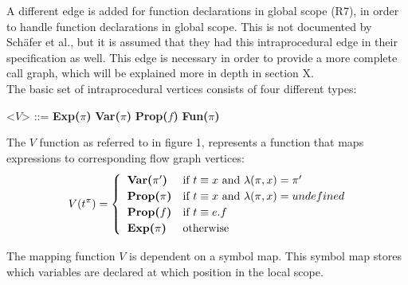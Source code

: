 \documentclass[journal,10pt]{IEEEtran} %
\begin{document}
A different edge is added for function declarations in global scope (R7), in order to handle function declarations in global scope. This is not documented by Sch\"{a}fer et al., but it is assumed that they had this intraprocedural edge in their specification as well. This edge is necessary in order to provide a more complete call graph, which will be explained more in depth in section X. \\ %

The basic set of intraprocedural vertices consists of four different types:
\vspace{0.5em}
\begin{grammar}
<$V$> ::= \textbf{Exp($\pi$)} 
\alt \textbf{Var($\pi$)} 
\alt \textbf{Prop($f$)} 
\alt \textbf{Fun($\pi$)} 
\end{grammar}

\vspace{0.5em}

The $V$ function as referred to in figure 1, represents a function that maps expressions to corresponding flow graph vertices:
\begin{equation*}
  V(t^\pi) = \begin{cases}
    \hspace*{0.2cm} \textbf{Var($\pi'$)} & \text{if~} t \equiv x \text{~and~} \lambda(\pi, x) = \pi' \\
    \hspace*{0.2cm} \textbf{Prop($\pi$)} & \text{if~} t \equiv x \text{~and~} \lambda(\pi, x) = undefined\\
    \hspace*{0.2cm} \textbf{Prop($f$)} & \text{if~} t \equiv e.f \\
    \hspace*{0.2cm} \textbf{Exp($\pi$)} &\text{otherwise}
  \end{cases}
\end{equation*}


The mapping function $V$ is dependent on a symbol map. This symbol map stores which variables are declared at which position in the local scope.
\end{document}
